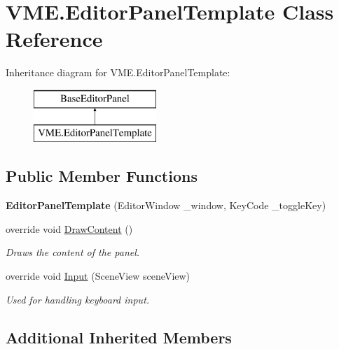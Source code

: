 \hypertarget{class_v_m_e_1_1_editor_panel_template}{}\section{V\+M\+E.\+Editor\+Panel\+Template Class Reference}
\label{class_v_m_e_1_1_editor_panel_template}
Inheritance diagram for V\+M\+E.\+Editor\+Panel\+Template\+:\begin{figure}[H]
\begin{center}
\leavevmode
\includegraphics[height=2.000000cm]{class_v_m_e_1_1_editor_panel_template}
\end{center}
\end{figure}
\subsection*{Public Member Functions}
\begin{DoxyCompactItemize}
\item 
{\bfseries Editor\+Panel\+Template} (Editor\+Window \+\_\+window, Key\+Code \+\_\+toggle\+Key)\hypertarget{class_v_m_e_1_1_editor_panel_template_aea32ee297d08364f9a9a8f3a04907ee9}{}\label{class_v_m_e_1_1_editor_panel_template_aea32ee297d08364f9a9a8f3a04907ee9}

\item 
override void \hyperlink{class_v_m_e_1_1_editor_panel_template_ad7ea6c92ea74e7482000cb1cfe4617a3}{Draw\+Content} ()
\begin{DoxyCompactList}\small\item\em Draws the content of the panel. \end{DoxyCompactList}\item 
override void \hyperlink{class_v_m_e_1_1_editor_panel_template_a816b7994b28d7ac4ae3ccd1ebbccf675}{Input} (Scene\+View scene\+View)
\begin{DoxyCompactList}\small\item\em Used for handling keyboard input. \end{DoxyCompactList}\end{DoxyCompactItemize}
\subsection*{Additional Inherited Members}


